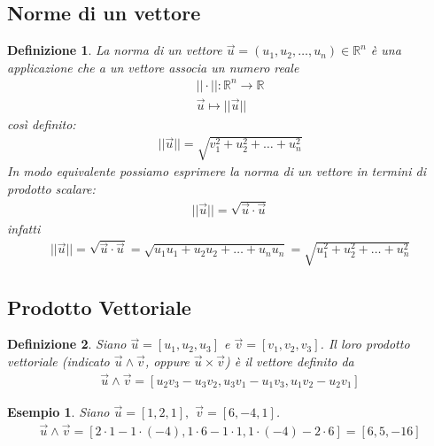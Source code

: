 \documentclass{article}
\newtheorem{defi}{Definizione}[section]
\newtheorem{esempio}{Esempio}[section]
\begin{document}
\subsection{Norme di un vettore}
\label{sec:normVett}
\begin{defi}
  La norma di un vettore $\vec{u}=(u_1,u_2,\dots,u_n)\in \mathds{R}^n$ è una
  applicazione che a un vettore associa un numero reale
  \begin{eqnarray*}
    ||\cdot||: \mathds{R}^n\to \mathds{R}\\
    \vec{u}\mapsto ||\vec{u}||
  \end{eqnarray*}
  così definito:
  \begin{eqnarray*}
    ||\vec{u}||=\sqrt{v_1^2+u_2^2+\dots+u^2_n}
  \end{eqnarray*}
  In modo equivalente possiamo esprimere la norma di un vettore in termini di
  prodotto scalare:
  \begin{eqnarray*}
    ||\vec{u}||=\sqrt{\vec{u}\cdot\vec{u}}
  \end{eqnarray*}
  infatti
  \begin{eqnarray*}
    ||\vec{u}||=\sqrt{\vec{u}\cdot\vec{u}}=\sqrt{u_1u_1+u_2u_2+\dots+u_nu_n}=
    \sqrt{u_1^2+u_2^2+\dots+u_n^2}
  \end{eqnarray*}
\end{defi}
\subsection{Prodotto Vettoriale}
\label{sec:prodVett}

\begin{defi}
  Siano $\vec{u}=[u_1,u_2,u_3]$ e $\vec{v}=[v_1,v_2,v_3]$. Il loro prodotto
  vettoriale (indicato $\vec{u} \wedge \vec{v}$, oppure $\vec{u}\times \vec{v}$)
  è il vettore definito da
  \begin{eqnarray*}
    \vec{u}\wedge \vec{v}=[u_2v_3-u_3v_2,u_3v_1-u_1v_3,u_1v_2-u_2v_1]
  \end{eqnarray*}
\end{defi}
\begin{esempio}
  Siano $\vec{u}=[1,2,1],$ $\vec{v}=[6,-4,1]$.
  \begin{eqnarray*}
    \vec{u}\wedge \vec{v}=[2\cdot 1 -1 \cdot (-4), 1 \cdot 6-1\cdot 1,1\cdot (-4) -2\cdot 6]= [6,5,-16]
  \end{eqnarray*}
\end{esempio}
\end{document}
